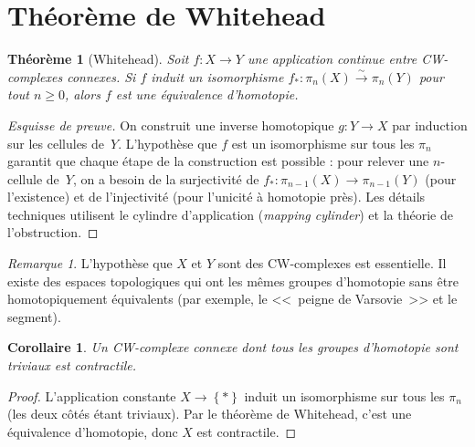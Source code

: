 \documentclass[12pt,a4paper,openany]{book}
\theoremstyle{definition}
\theoremstyle{plain}
\newtheorem{theoreme}[definition]{Théorème}
\newtheorem{corollaire}[definition]{Corollaire}
\theoremstyle{remark}
\newtheorem{remarque}[definition]{Remarque}
\newcommand{\set}[1]{\left\{#1\right\}}
\begin{document}

\section{Théorème de Whitehead}\label{sec:whitehead}

\begin{theoreme}[Whitehead]\label{thm:whitehead}
  Soit $f \colon X \to Y$ une application continue entre CW-complexes connexes.
  Si $f$ induit un isomorphisme $f_* \colon \pi_n(X) \xrightarrow{\sim} \pi_n(Y)$
  pour tout $n \geq 0$, alors $f$ est une équivalence d'homotopie.
\end{theoreme}

\begin{proof}[Esquisse de preuve]
  On construit une inverse homotopique $g \colon Y \to X$ par induction sur les
  cellules de~$Y$. L'hypothèse que $f$ est un isomorphisme sur tous les $\pi_n$
  garantit que chaque étape de la construction est possible : pour relever une
  $n$-cellule de~$Y$, on a besoin de la surjectivité de
  $f_* \colon \pi_{n-1}(X) \to \pi_{n-1}(Y)$ (pour l'existence) et de
  l'injectivité (pour l'unicité à homotopie près). Les détails techniques
  utilisent le cylindre d'application (\emph{mapping cylinder}) et la théorie
  de l'obstruction.
\end{proof}

\begin{remarque}\label{rem:whitehead-cw}
  L'hypothèse que $X$ et $Y$ sont des CW-complexes est essentielle. Il existe des
  espaces topologiques qui ont les mêmes groupes d'homotopie sans être homotopiquement
  équivalents (par exemple, le <<~peigne de Varsovie~>>
  et le segment).
\end{remarque}

\begin{corollaire}\label{cor:whitehead-contractile}
  Un CW-complexe connexe dont tous les groupes d'homotopie sont triviaux est
  contractile.
\end{corollaire}

\begin{proof}
  L'application constante $X \to \set{*}$ induit un isomorphisme sur tous les
  $\pi_n$ (les deux côtés étant triviaux). Par le théorème de Whitehead, c'est
  une équivalence d'homotopie, donc $X$ est contractile.
\end{proof}
\end{document}
